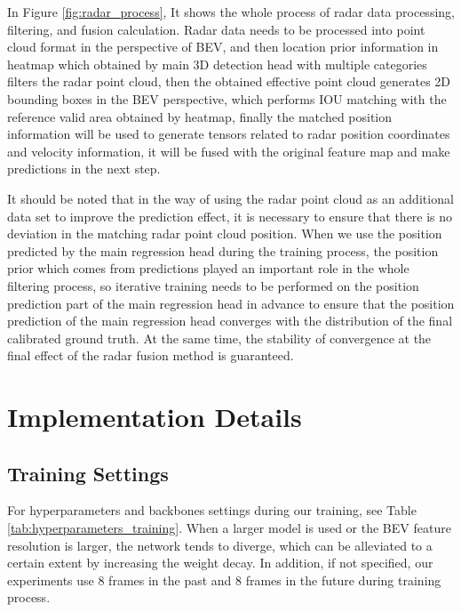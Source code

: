 \documentclass[10pt,twocolumn,letterpaper]{article}
\begin{document}
In Figure \ref{fig:radar_process}, It shows the whole process of radar data processing, filtering, and fusion calculation. Radar data needs to be processed into point cloud format in the perspective of BEV, and then location prior information in heatmap which obtained by main 3D detection head with multiple categories filters the radar point cloud, then the obtained effective point cloud generates 2D bounding boxes in the BEV perspective,  which performs IOU matching with the reference valid area obtained by heatmap, finally the matched position information will be used to generate tensors related to radar position coordinates and velocity information, it will be fused with the original feature map and make predictions in the next step.

It should be noted that in the way of using the radar point cloud as an additional data set to improve the prediction effect, it is necessary to ensure that there is no deviation in the matching radar point cloud position. When we use the position predicted by the main regression head during the training process, the position prior which comes from predictions played an important role in the whole filtering process, so iterative training needs to be performed on the position prediction part of the main regression head in advance to ensure that the position prediction of the main regression head converges with the distribution of the final calibrated ground truth. At the same time, the stability of convergence at the final effect of the radar fusion method is guaranteed.
\section{Implementation Details}

\subsection{Training Settings}
For hyperparameters and backbones settings during our training, see Table \ref{tab:hyperparameters_training}. When a larger model is used or the BEV feature resolution is larger, the network tends to diverge, which can be alleviated to a certain extent by increasing the weight decay. In addition, if not specified, our experiments use 8 frames in the past and 8 frames in the future during training process. 
\end{document}
